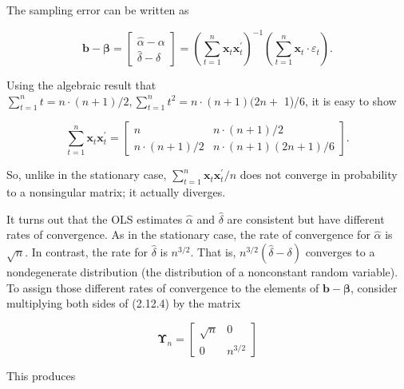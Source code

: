 \documentclass[10pt]{article}
\begin{document}
The sampling error can be written as

\[
\mathbf{b}-\boldsymbol{\beta}=\left[\begin{array}{c}
\hat{\alpha}-\alpha  \tag{2.12.4}\\
\hat{\delta}-\delta
\end{array}\right]=\left(\sum_{t=1}^{n} \mathbf{x}_{t} \mathbf{x}_{t}^{\prime}\right)^{-1}\left(\sum_{t=1}^{n} \mathbf{x}_{t} \cdot \varepsilon_{t}\right) .
\]

Using the algebraic result that $\sum_{t=1}^{n} t=n \cdot(n+1) / 2, \sum_{t=1}^{n} t^{2}=n \cdot(n+1)(2 n+$ 1)/6, it is easy to show

\[
\sum_{t=1}^{n} \mathbf{x}_{t} \mathbf{x}_{t}^{\prime}=\left[\begin{array}{cc}
n & n \cdot(n+1) / 2  \tag{2.12.5}\\
n \cdot(n+1) / 2 & n \cdot(n+1)(2 n+1) / 6
\end{array}\right] .
\]

So, unlike in the stationary case, $\sum_{t=1}^{n} \mathbf{x}_{t} \mathbf{x}_{t}^{\prime} / n$ does not converge in probability to a nonsingular matrix; it actually diverges.

It turns out that the OLS estimates $\hat{\alpha}$ and $\hat{\delta}$ are consistent but have different rates of convergence. As in the stationary case, the rate of convergence for $\hat{\alpha}$ is $\sqrt{n}$. In contrast, the rate for $\hat{\delta}$ is $n^{3 / 2}$. That is, $n^{3 / 2}(\hat{\delta}-\delta)$ converges to a nondegenerate distribution (the distribution of a nonconstant random variable). To assign those different rates of convergence to the elements of $\mathbf{b}-\boldsymbol{\beta}$, consider multiplying both sides of (2.12.4) by the matrix

\[
\mathbf{\Upsilon}_{n}=\left[\begin{array}{cc}
\sqrt{n} & 0  \tag{2.12.6}\\
0 & n^{3 / 2}
\end{array}\right]
\]

This produces
\end{document}
